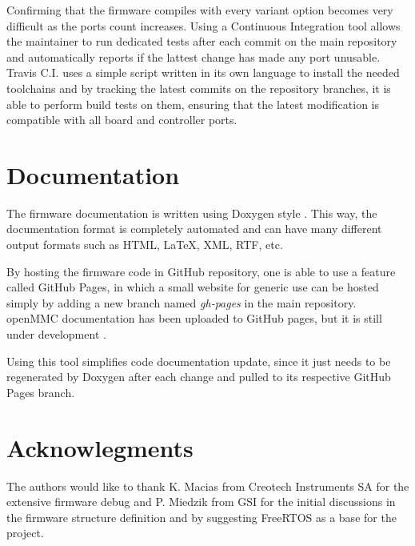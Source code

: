 \documentclass[a4paper,
              ]{jacow}
\begin{document}
Confirming that the firmware compiles with every variant option becomes very difficult as the ports count increases.
Using a Continuous Integration tool allows the maintainer to run dedicated tests after each commit on the main repository and automatically reports if the lattest change has made any port unusable.
Travis C.I. \cite{travis-ci} uses a simple script written in its own language to install the needed toolchains and by tracking the latest commits on the repository branches, it is able to perform build tests on them, ensuring that the latest modification is compatible with all board and controller ports.

\section{Documentation}
The firmware documentation is written using Doxygen style \cite{doxygen}. This way, the documentation format is completely automated and can have many different output formats such as HTML, \LaTeX , XML, RTF, etc.

By hosting the firmware code in GitHub repository, one is able to use a feature called GitHub Pages, in which a small website for generic use can be hosted simply by adding a new branch named \emph{gh-pages} in the main repository. openMMC documentation has been uploaded to GitHub pages, but it is still under development \cite{openmmc-gh-page}.

Using this tool simplifies code documentation update, since it just needs to be regenerated by Doxygen after each change and pulled to its respective GitHub Pages branch.

\section{Acknowlegments}
The authors would like to thank K. Macias from Creotech Instruments SA for the extensive firmware debug and P. Miedzik from GSI for the initial discussions in the firmware structure definition and by suggesting FreeRTOS as a base for the project.

\iffalse  %
	\newpage
	\printbibliography

\else
\end{document}

